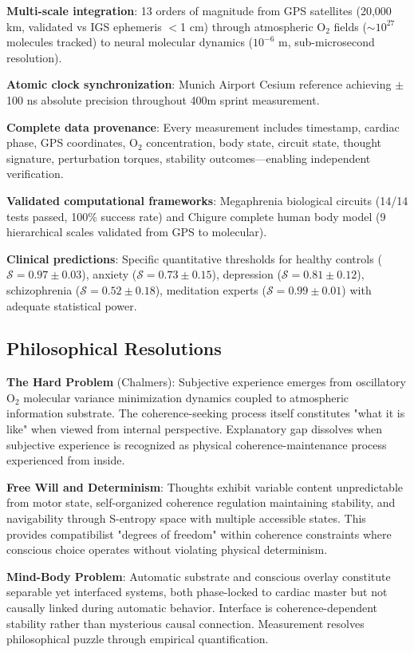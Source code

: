 \documentclass[11pt,onecolumn]{article}
\begin{document}
\textbf{Multi-scale integration}: 13 orders of magnitude from GPS satellites (20,000 km, validated vs IGS ephemeris $<$1 cm) through atmospheric O$_2$ fields ($\sim 10^{27}$ molecules tracked) to neural molecular dynamics ($10^{-6}$ m, sub-microsecond resolution).

\textbf{Atomic clock synchronization}: Munich Airport Cesium reference achieving $\pm$100 ns absolute precision throughout 400m sprint measurement.

\textbf{Complete data provenance}: Every measurement includes timestamp, cardiac phase, GPS coordinates, O$_2$ concentration, body state, circuit state, thought signature, perturbation torques, stability outcomes---enabling independent verification.

\textbf{Validated computational frameworks}: Megaphrenia biological circuits (14/14 tests passed, 100\% success rate) and Chigure complete human body model (9 hierarchical scales validated from GPS to molecular).

\textbf{Clinical predictions}: Specific quantitative thresholds for healthy controls ($\mathcal{S} = 0.97 \pm 0.03$), anxiety ($\mathcal{S} = 0.73 \pm 0.15$), depression ($\mathcal{S} = 0.81 \pm 0.12$), schizophrenia ($\mathcal{S} = 0.52 \pm 0.18$), meditation experts ($\mathcal{S} = 0.99 \pm 0.01$) with adequate statistical power.

\subsection{Philosophical Resolutions}

\textbf{The Hard Problem} (Chalmers): Subjective experience emerges from oscillatory O$_2$ molecular variance minimization dynamics coupled to atmospheric information substrate. The coherence-seeking process itself constitutes "what it is like" when viewed from internal perspective. Explanatory gap dissolves when subjective experience is recognized as physical coherence-maintenance process experienced from inside.

\textbf{Free Will and Determinism}: Thoughts exhibit variable content unpredictable from motor state, self-organized coherence regulation maintaining stability, and navigability through S-entropy space with multiple accessible states. This provides compatibilist "degrees of freedom" within coherence constraints where conscious choice operates without violating physical determinism.

\textbf{Mind-Body Problem}: Automatic substrate and conscious overlay constitute separable yet interfaced systems, both phase-locked to cardiac master but not causally linked during automatic behavior. Interface is coherence-dependent stability rather than mysterious causal connection. Measurement resolves philosophical puzzle through empirical quantification.
\end{document}
